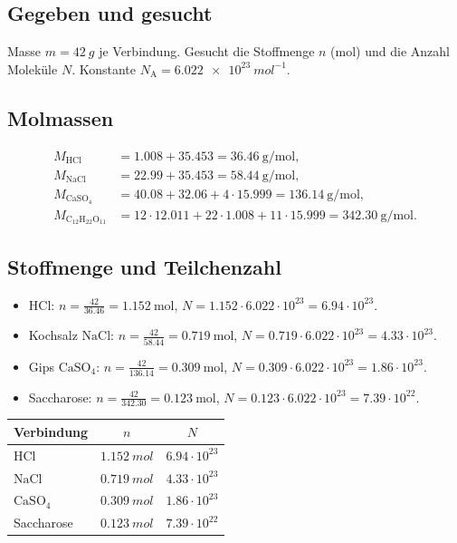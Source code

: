 
\subsection*{Gegeben und gesucht}
Masse $m = \qty{42}{g}$ je Verbindung. Gesucht die Stoffmenge $n$ (mol) und die
Anzahl Moleküle $N$. Konstante $N_\mathrm{A} = \qty{6.022e23}{mol^{-1}}$.

\subsection*{Molmassen}
\begin{align*}
  M_{\mathrm{HCl}} &= 1.008 + 35.453 = 36.46\ \mathrm{g/mol},\\
  M_{\mathrm{NaCl}} &= 22.99 + 35.453 = 58.44\ \mathrm{g/mol},\\
  M_{\mathrm{CaSO_4}} &= 40.08 + 32.06 + 4\cdot 15.999 = 136.14\ \mathrm{g/mol},\\
  M_{\mathrm{C_{12}H_{22}O_{11}}} &= 12\cdot 12.011 + 22\cdot 1.008
      + 11\cdot 15.999 = 342.30\ \mathrm{g/mol}.
\end{align*}

\subsection*{Stoffmenge und Teilchenzahl}
\begin{itemize}
  \item[a)] $\mathrm{HCl}$:
    $n = \frac{42}{36.46} = 1.152\ \mathrm{mol}$,
    $N = 1.152 \cdot 6.022\cdot10^{23} = 6.94\cdot10^{23}$.
  \item[b)] Kochsalz $\mathrm{NaCl}$:
    $n = \frac{42}{58.44} = 0.719\ \mathrm{mol}$,
    $N = 0.719 \cdot 6.022\cdot10^{23} = 4.33\cdot10^{23}$.
  \item[c)] Gips $\mathrm{CaSO_4}$:
    $n = \frac{42}{136.14} = 0.309\ \mathrm{mol}$,
    $N = 0.309 \cdot 6.022\cdot10^{23} = 1.86\cdot10^{23}$.
  \item[d)] Saccharose:
    $n = \frac{42}{342.30} = 0.123\ \mathrm{mol}$,
    $N = 0.123 \cdot 6.022\cdot10^{23} = 7.39\cdot10^{22}$.
\end{itemize}

\begin{ergebnis}
\begin{center}
\begin{tabular}{lcc}
\toprule
Verbindung & $n$ & $N$ \\
\midrule
$\mathrm{HCl}$          & $\qty{1.152}{mol}$ & $6.94\cdot10^{23}$ \\
$\mathrm{NaCl}$         & $\qty{0.719}{mol}$ & $4.33\cdot10^{23}$ \\
$\mathrm{CaSO_4}$       & $\qty{0.309}{mol}$ & $1.86\cdot10^{23}$ \\
Saccharose              & $\qty{0.123}{mol}$ & $7.39\cdot10^{22}$ \\
\bottomrule
\end{tabular}
\end{center}
\end{ergebnis}

